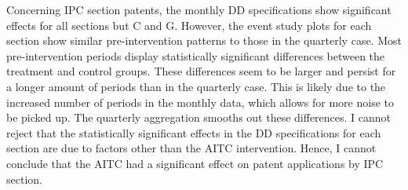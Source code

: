 \documentclass[../main.tex]{subfiles}
\begin{document}
Concerning IPC section patents, the monthly DD specifications show significant effects for all sections but C and G. However, the event study plots for each section show similar pre-intervention patterns to those in the quarterly case. Most pre-intervention periods display statistically significant differences between the treatment and control groups. These differences seem to be larger and persist for a longer amount of periods than in the quarterly case. This is likely due to the increased number of periods in the monthly data, which allows for more noise to be picked up. The quarterly aggregation smooths out these differences. I cannot reject that the statistically significant effects in the DD specifications for each section are due to factors other than the AITC intervention. Hence, I cannot conclude that the AITC had a significant effect on patent applications by IPC section.
\end{document}
